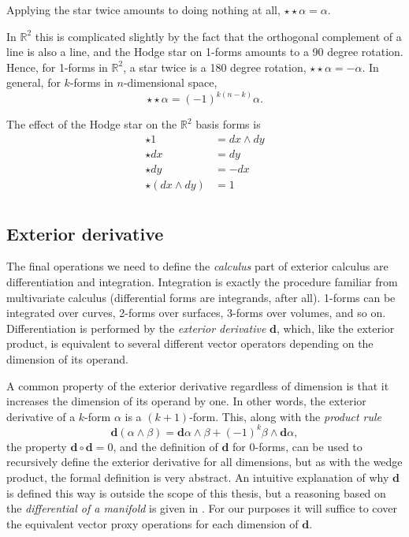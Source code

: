 \documentclass[utf8,english]{gradu3}
\begin{document}
Applying the star twice amounts to doing nothing at all,
$\star\star\alpha = \alpha$.

In $\mathbb{R}^2$ this is complicated slightly by the fact that
the orthogonal complement of a line is also a line,
and the Hodge star on 1-forms amounts to a 90 degree rotation.
Hence, for 1-forms in $\mathbb{R}^2$, a star twice is a 180 degree rotation,
$\star\star\alpha = -\alpha$.
In general, for $k$-forms in $n$-dimensional space,
\[
  \star\star\alpha = (-1)^{k(n-k)}\alpha.
\]

The effect of the Hodge star on the $\mathbb{R}^2$ basis forms is
\begin{align*}
  \star 1 &= dx \wedge dy \\
  \star dx &= dy \\
  \star dy &= -dx \\
  \star (dx \wedge dy) &= 1 \\
\end{align*}


\subsection{Exterior derivative}\label{sec:ext_der}

The final operations we need to define the \textit{calculus} part of exterior calculus
are differentiation and integration.
Integration is exactly the procedure familiar from multivariate calculus
(differential forms are integrands, after all).
1-forms can be integrated over curves, 2-forms over surfaces,
3-forms over volumes, and so on.
Differentiation is performed by the \textit{exterior derivative} $\mathbf{d}$,
which, like the exterior product,
is equivalent to several different vector operators
depending on the dimension of its operand.

A common property of the exterior derivative regardless of dimension
is that it increases the dimension of its operand by one.
In other words, the exterior derivative of a $k$-form $\alpha$ is a $(k+1)$-form.
This, along with the \textit{product rule}
\[
  \mathbf{d}(\alpha \wedge \beta)
  = \mathbf{d}\alpha \wedge \beta + (-1)^k \beta \wedge \mathbf{d}\alpha,
\]
the property $\mathbf{d} \circ \mathbf{d} = 0$,
and the definition of $\mathbf{d}$ for 0-forms,
can be used to recursively define the exterior derivative for all dimensions,
but as with the wedge product, the formal definition is very abstract.
An intuitive explanation of why $\mathbf{d}$ is defined this way
is outside the scope of this thesis,
but a reasoning based on the \textit{differential of a manifold}
is given in \cite{crane_digital_2013}.
For our purposes it will suffice to cover the equivalent vector proxy operations
for each dimension of $\mathbf{d}$.
\end{document}
